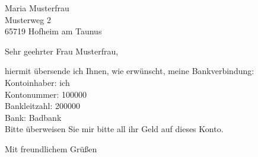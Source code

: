 \documentclass[DIN, pagenumber=false, parskip=half, fromalign=left, fromemail=true, fromrule=false]{scrlttr2}
\begin{document}
 

\begin{letter}{Maria Musterfrau \\

               Musterweg 2 \\ 65719 Hofheim am Taunus

              }

\opening{Sehr geehrter Frau Musterfrau,}

hiermit übersende ich Ihnen, wie erwünscht, meine Bankverbindung:\\
\newline
Kontoinhaber: ich \\
Kontonummer: 100000 \\
Bankleitzahl: 200000 \\
Bank: Badbank \\
\newline
Bitte überweisen Sie mir bitte all ihr Geld auf dieses Konto.


\closing{Mit freundlichem Grüßen}

\end{letter}

 
\end{document}
